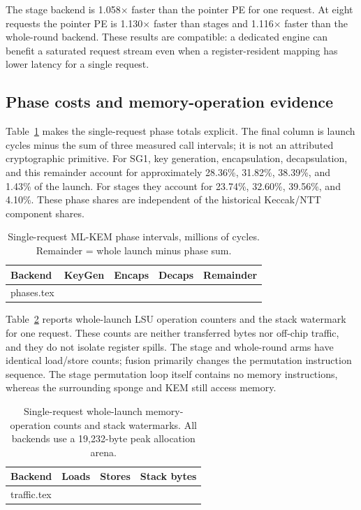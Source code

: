 \documentclass[conference,letterpaper]{IEEEtran}
\makeatletter
\newcommand{\tablerows}[1]{\@@input #1 }
\makeatother
\begin{document}
The stage backend is 1.058$\times$ faster than the pointer PE for one request.
At eight requests the pointer PE is 1.130$\times$ faster than stages and
1.116$\times$ faster than the whole-round backend.
These results are compatible: a dedicated engine can benefit a saturated
request stream even when a register-resident mapping has lower latency
for a single request.

\subsection{Phase costs and memory-operation evidence}
Table~\ref{tab:phases} makes the single-request phase totals explicit.
The final column is launch cycles minus the sum of three measured call
intervals; it is not an attributed cryptographic primitive.
For SG1, key generation, encapsulation, decapsulation, and this remainder
account for approximately 28.36\%, 31.82\%, 38.39\%, and 1.43\%
of the launch. For stages they account for 23.74\%, 32.60\%, 39.56\%,
and 4.10\%. These phase shares are independent of the historical
Keccak/NTT component shares.

\begin{table}[t]
\caption{Single-request ML-KEM phase intervals, millions of cycles.
Remainder = whole launch minus phase sum.}
\label{tab:phases}
\centering\footnotesize\setlength{\tabcolsep}{3pt}
\begin{tabular}{@{}lrrrr@{}}
\toprule
Backend & KeyGen & Encaps & Decaps & Remainder \\
\midrule
\tablerows{phases.tex}
\bottomrule
\end{tabular}
\end{table}

Table~\ref{tab:traffic} reports whole-launch LSU operation counters and
the stack watermark for one request. These counts are neither transferred
bytes nor off-chip traffic, and they do not isolate register spills.
The stage and whole-round arms have identical load/store counts;
fusion primarily changes the permutation instruction sequence.
The stage permutation loop itself contains no memory instructions,
whereas the surrounding sponge and KEM still access memory.

\begin{table}[t]
\caption{Single-request whole-launch memory-operation counts and stack
watermarks. All backends use a 19,232-byte peak allocation arena.}
\label{tab:traffic}
\centering\footnotesize\setlength{\tabcolsep}{4pt}
\begin{tabular}{@{}lrrr@{}}
\toprule
Backend & Loads & Stores & Stack bytes \\
\midrule
\tablerows{traffic.tex}
\bottomrule
\end{tabular}
\end{table}
\end{document}
